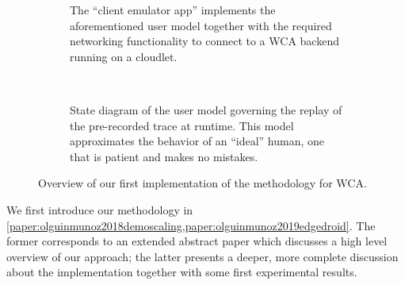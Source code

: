 \begin{figure}
\begin{subfigure}[b]{.47\textwidth}
{            The ``client emulator app'' implements the aforementioned user model together with the required networking functionality to connect to a \gls{WCA} backend running on a cloudlet.%
        }
    \end{subfigure}\\
    \medskip
    \begin{subfigure}[t]{\textwidth}
        \centering
        \caption{State diagram of the user model governing the replay of the pre-recorded trace at runtime. This model approximates the behavior of an ``ideal'' human, one that is patient and makes no mistakes.}\label{fig:usermodel}
    \end{subfigure}
    \caption{%
        Overview of our first implementation of the methodology for \gls{WCA}.
    }\label{fig:edgedroid1:trace}
\end{figure}

We first introduce our methodology in \cref{paper:olguinmunoz2018demoscaling,paper:olguinmunoz2019edgedroid}.
The former corresponds to an extended abstract paper which discusses a high level overview of our approach; the latter presents a deeper, more complete discussion about the implementation together with some first experimental results.

